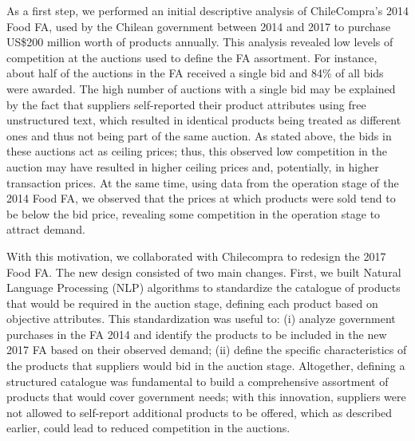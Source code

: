 

As a first step, we performed an initial descriptive analysis of ChileCompra's 2014 Food FA, used by the Chilean government between 2014 and 2017 to purchase US\$200 million worth of products annually. This analysis revealed low levels of competition at the auctions used to define the FA assortment. For instance, about half of the auctions in the FA received a single bid and {84\%} of all bids were awarded. The high number of auctions with a single bid may be explained by the fact that suppliers self-reported their product attributes using free unstructured text, which resulted in identical products being treated as different ones and thus not being part of the same auction. As stated above, the bids in these auctions act as ceiling prices; thus, this observed low competition in the auction may have resulted in higher ceiling prices and, potentially, in higher transaction prices. At the same time, using data from the operation stage of the 2014 Food FA, we observed that the prices at which products were sold tend to be below the bid price, revealing some competition in the operation stage to attract demand.

With this motivation, we collaborated with Chilecompra to redesign the 2017 Food FA. The new design consisted of two main changes. First, we built Natural Language Processing (NLP) algorithms to standardize the catalogue of products that would be required in the auction stage, defining each product based on objective attributes. This standardization was useful to: (i) analyze government purchases in the FA 2014 and identify the products to be included in the new 2017 FA based on their observed demand; (ii) define the specific characteristics of the products that suppliers would bid in the auction stage. Altogether, defining a structured catalogue was fundamental to build a comprehensive assortment of products that would cover government needs; with this innovation, suppliers were not allowed to self-report additional products to be offered, which as described earlier, could lead to reduced competition in the auctions.

